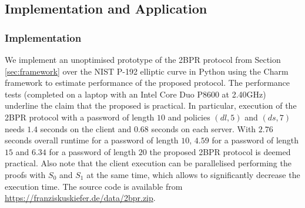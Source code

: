 \subsection{Implementation and Application}

\subsubsection{Implementation}
We implement an unoptimised prototype of the 2BPR protocol from Section \ref{sec:framework} over the NIST P-192 elliptic curve \cite{nist} in Python using the Charm framework \cite{charm13} to estimate performance of the proposed protocol.
The performance tests (completed on a laptop with an Intel Core Duo P8600 at 2.40GHz) underline the claim that the proposed is practical.
In particular, execution of the 2BPR protocol with a password of length $10$ and policies $(dl, 5)$ and $(ds, 7)$ needs $1.4$ seconds on the client and $0.68$ seconds on each server.
With $2.76$ seconds overall runtime for a password of length $10$, $4.59$ for a password of length $15$ and $6.34$ for a password of length $20$ the proposed 2BPR protocol is deemed practical.
Also note that the client execution can be parallelised performing the proofs with $S_0$ and $S_1$ at the same time, which allows to significantly decrease the execution time.
The source code is available from \url{https://franziskuskiefer.de/data/2bpr.zip}.

